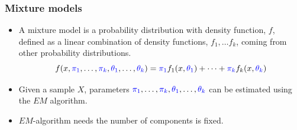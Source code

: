 \begin{frame}

\frametitle{Mixture models}
\begin{itemize}
\item A mixture model is a probability distribution with density function, $f$, defined as a linear combination of density functions, $f_1, \dots f_k$, coming from other probability distributions.
\[
f(x, {\color{blue}\pi_1}, \dots, {\color{blue}\pi_k}, {\color{blue}\theta_1}, \dots, {\color{blue}\theta_k}) = {\color{blue}\pi_1} f_1(x, {\color{blue}\theta_1}) + \dots + {\color{blue}\pi_k} f_k(x, {\color{blue}\theta_k})
\]
\item Given a  sample $X$, parameters ${\color{blue}\pi_1}, \dots, {\color{blue}\pi_k}, {\color{blue}\theta_1}, \dots, {\color{blue}\theta_k}$ can be estimated using the $EM$ algorithm.
\item $EM$-algorithm needs the number of components is fixed.
\end{itemize}
\end{frame}

